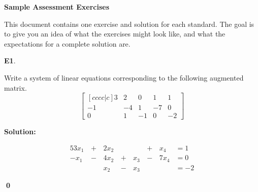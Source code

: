 \documentclass{article}
\newenvironment{problem}[1]
{
	\begin{flushleft}
	\textbf{#1}.
	\ignorespaces
}
{
	\end{flushleft}
}
\newenvironment{solution}
{
	\ignorespaces
	\textbf{Solution:}
}
{
	\ignorespacesafterend
	\begin{flushright}
	{\bfseries \qed}
	\end{flushright}
}
\begin{document}
\begin{center}
\Large \textbf{Sample Assessment Exercises}
\end{center}

This document contains one exercise and solution for each standard.
The goal is to give you an idea of what the exercises might look like,
and what the expectations for a complete solution are.

\begin{problem}{E1}
Write a system of linear equations corresponding to the following
augmented matrix.
\[
\begin{bmatrix}[cccc|c]
3 & 2 & 0 & 1 & 1 \\
-1 & -4 & 1 & -7 & 0 \\
0 & 1 & -1 & 0 & -2
\end{bmatrix}
\]
\end{problem}
\begin{solution}
\begin{alignat*}{5}
3x_1 &\,+\,& 2x_2 &\,\,& &\,+\,&x_4 &= 1 \\
-x_1 &\,-\,& 4x_2 &\,+\,&x_3&\,-\,&7x_4 &= 0 \\
&\,\,& x_2 &\,-\,&x_3 &\,\,&  &= -2
\end{alignat*}
\end{solution}
\end{document}
